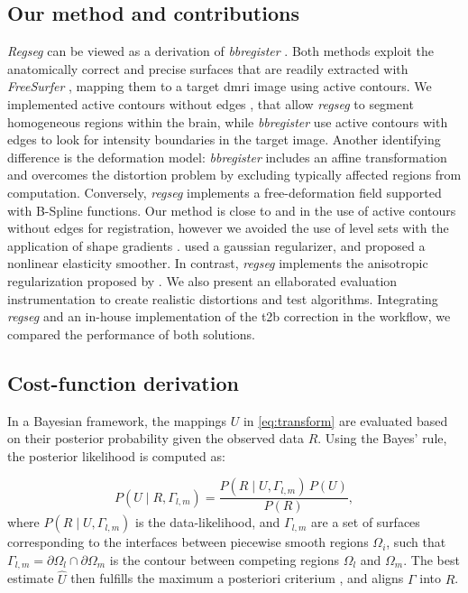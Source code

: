 \subsection{Our method and contributions}
\label{sec:contributions}
%
\emph{Regseg} can be viewed as a derivation of \emph{bbregister} \citep{greve_accurate_2009}.
Both methods exploit the anatomically correct and precise surfaces that are readily
  extracted with \emph{FreeSurfer} \citep{fischl_freesurfer_2012}, mapping them
  to a target \gls*{dmri} image using active contours.
We implemented active contours without edges \citep{chan_active_2001}, that allow
  \emph{regseg} to segment homogeneous regions within the brain, while \emph{bbregister}
  use active contours with edges to look for intensity boundaries in the target image.
Another identifying difference is the deformation model:
  \emph{bbregister} includes an affine transformation and overcomes the distortion
  problem by excluding typically affected regions from computation.
Conversely, \emph{regseg} implements a free-deformation field supported with B-Spline
  functions.
Our method is close to \citep{guyader_combined_2011} and \citep{gorthi_active_2011}
  in the use of active contours without edges for registration, however we avoided
  the use of level sets with the application of shape gradients
  \citep{besson_dream2s_2003,herbulot_segmentation_2006}.
\cite{gorthi_active_2011} used a gaussian regularizer, and \cite{guyader_combined_2011}
  proposed a nonlinear elasticity smoother.
In contrast, \emph{regseg} implements the anisotropic regularization proposed by
  \citep{nagel_investigation_1986}.
We also present an ellaborated evaluation instrumentation to create realistic distortions
  and test algorithms.
Integrating \emph{regseg} and an in-house implementation of the \gls*{t2b} correction
  in the workflow, we compared the performance of both solutions.


\subsection{Cost-function derivation}\label{sec:methods_map}
%
In a Bayesian framework, the mappings $U$ in \eqref{eq:transform} are
  evaluated based on their posterior probability given the observed data
  $R$.
Using the Bayes' rule, the posterior likelihood is computed as:

  \begin{equation}
  P(U \mid R,\Gamma_{l,m}) = \frac{P(R \mid U,\Gamma_{l,m})\, P(U)}{P(R)},
  \label{eq:bayes_rule}
  \end{equation}
%
  where $P(R \mid U,\Gamma_{l,m})$ is the data-likelihood, and
  $\Gamma_{l,m}$ are a set of surfaces corresponding to the interfaces
  between piecewise smooth regions $\Omega_i$, such that
  $\Gamma_{l,m} = \partial \Omega_l \cap \partial \Omega_m$ is the
  contour between competing regions $\Omega_l$ and $\Omega_m$.
The best estimate $\hat{U}$ then fulfills the maximum a posteriori criterium
  \citep{bishop_pattern_2006}, and aligns $\Gamma$ into $R$.

